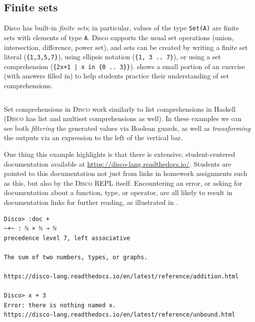 \documentclass[submission,copyright,creativecommons]{eptcs}
\newcommand{\disco}{\textsc{Disco}\xspace}
\newcommand{\pref}[1]{\prettyref{#1}}
\begin{document}
\subsection{Finite sets}

Disco has built-in \emph{finite sets}; in particular, values of the
type \texttt{Set(A)} are finite sets with elements of type
\texttt{A}. Disco supports the usual set operations (union,
intersection, difference, power set), and sets can be created by
writing a finite set literal (\verb|{1,3,5,7}|), using ellipsis
notation (\verb|{1, 3 .. 7}|), or using a set comprehension
(\verb-{2x+1 | x in {0 .. 3}}-). \pref{lst:sets} shows a small portion
of an exercise (with answers filled in) to help students practice
their understanding of set comprehensions.

\begin{listing}[!htp]
\inputminted{text}{examples/sets.disco}
\caption{Set comprehension exercise}
\label{lst:sets}
\end{listing}

Set comprehensions in \disco work similarly to list comprehensions in
Haskell (\disco has list and multiset comprehensions as well).  In
these examples we can see both \emph{filtering} the generated values via
Boolean guards, as well as \emph{transforming} the outputs via an
expression to the left of the vertical bar.

One thing this example highlights is that there is extensive,
student-centered documentation available at
\url{https://disco-lang.readthedocs.io/}.  Students are pointed to
this documentation not just from links in homework assignments such as
this, but also by the \disco REPL itself. Encountering an error, or
asking for documentation about a function, type, or operator, are
all likely to result in documentation links for further reading, as
illustrated in \pref{lst:doc}.

\begin{listing}[!htp]
\begin{verbatim}
Disco> :doc +
~+~ : ℕ × ℕ → ℕ
precedence level 7, left associative

The sum of two numbers, types, or graphs.

https://disco-lang.readthedocs.io/en/latest/reference/addition.html

Disco> x + 3
Error: there is nothing named x.
https://disco-lang.readthedocs.io/en/latest/reference/unbound.html
\end{verbatim}
\caption{\disco generates links to online documentation}
\label{lst:doc}
\end{listing}
\end{document}
